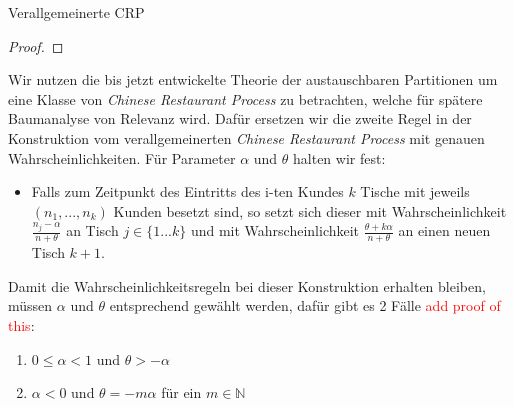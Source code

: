 \begin{section}{Verallgemeinerte CRP}
\begin{proof}
\end{proof}
Wir nutzen die bis jetzt entwickelte Theorie der austauschbaren Partitionen um eine Klasse von \textit{Chinese Restaurant Process} zu betrachten, welche für spätere Baumanalyse von Relevanz wird. Dafür ersetzen wir die zweite Regel in der Konstruktion vom verallgemeinerten \textit{Chinese Restaurant Process} mit genauen Wahrscheinlichkeiten. Für Parameter $\alpha$ und $\theta$ halten wir fest:
\begin{itemize} 
    \item Falls zum Zeitpunkt des Eintritts des i-ten Kundes $k$ Tische mit jeweils $(n_1,...,n_k)$ Kunden besetzt sind, so setzt sich dieser mit Wahrscheinlichkeit $\frac{n_j-\alpha}{n + \theta}$ an Tisch $j \in \{1...k\}$ und mit Wahrscheinlichkeit $\frac{\theta + k\alpha}{n + \theta}$ an einen neuen Tisch $k+1$.
\end{itemize}
Damit die Wahrscheinlichkeitsregeln bei dieser Konstruktion erhalten bleiben, müssen $\alpha$ und $\theta$ entsprechend gewählt werden, dafür gibt es 2 Fälle \textcolor{red}{add proof of this}: 
\begin{enumerate}
    \item $ 0 \leq \alpha < 1$ und $\theta > - \alpha $ 
    \item $\alpha < 0$ und $\theta = -m \alpha$ für ein $m \in \mathbb{N}$
\end{enumerate}


\end{section}
